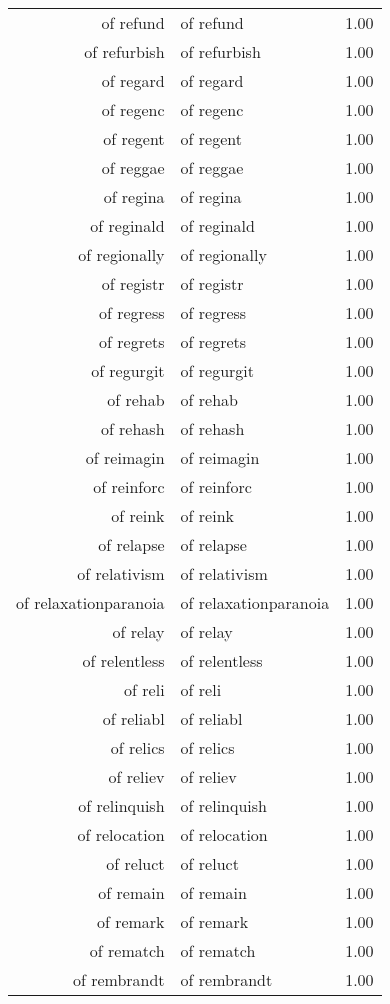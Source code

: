 \begin{table}[ht]
\begin{tabular}{rlr}
  of refund & of refund & 1.00 \\ 
  of refurbish & of refurbish & 1.00 \\ 
  of regard & of regard & 1.00 \\ 
  of regenc & of regenc & 1.00 \\ 
  of regent & of regent & 1.00 \\ 
  of reggae & of reggae & 1.00 \\ 
  of regina & of regina & 1.00 \\ 
  of reginald & of reginald & 1.00 \\ 
  of regionally & of regionally & 1.00 \\ 
  of registr & of registr & 1.00 \\ 
  of regress & of regress & 1.00 \\ 
  of regrets & of regrets & 1.00 \\ 
  of regurgit & of regurgit & 1.00 \\ 
  of rehab & of rehab & 1.00 \\ 
  of rehash & of rehash & 1.00 \\ 
  of reimagin & of reimagin & 1.00 \\ 
  of reinforc & of reinforc & 1.00 \\ 
  of reink & of reink & 1.00 \\ 
  of relapse & of relapse & 1.00 \\ 
  of relativism & of relativism & 1.00 \\ 
  of relaxationparanoia & of relaxationparanoia & 1.00 \\ 
  of relay & of relay & 1.00 \\ 
  of relentless & of relentless & 1.00 \\ 
  of reli & of reli & 1.00 \\ 
  of reliabl & of reliabl & 1.00 \\ 
  of relics & of relics & 1.00 \\ 
  of reliev & of reliev & 1.00 \\ 
  of relinquish & of relinquish & 1.00 \\ 
  of relocation & of relocation & 1.00 \\ 
  of reluct & of reluct & 1.00 \\ 
  of remain & of remain & 1.00 \\ 
  of remark & of remark & 1.00 \\ 
  of rematch & of rematch & 1.00 \\ 
  of rembrandt & of rembrandt & 1.00 \\ 

\end{tabular}
\end{table}
